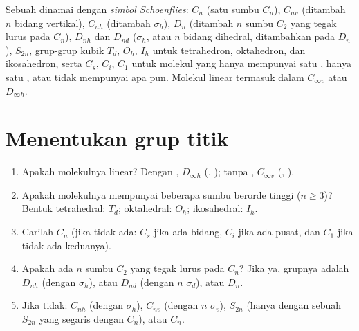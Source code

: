 \begin{definition}\label{def:b3:point-groups:schoenflies}
Sebuah  dinamai dengan \emph{simbol Schoenflies}:
$C_n$ (satu sumbu $C_n$), $C_{nv}$ (ditambah $n$ bidang vertikal), $C_{nh}$
(ditambah $\sigma_h$), $D_n$ (ditambah $n$ sumbu $C_2$ yang tegak lurus pada
$C_n$), $D_{nh}$ dan $D_{nd}$ ($\sigma_h$, atau $n$ bidang dihedral,
ditambahkan pada $D_n$), $S_{2n}$, grup-grup kubik $T_d$, $O_h$, $I_h$ untuk
tetrahedron, oktahedron, dan ikosahedron, serta $C_s$, $C_i$, $C_1$ untuk
molekul yang hanya mempunyai satu , hanya satu ,
atau tidak mempunyai apa pun. Molekul linear termasuk dalam $C_{\infty v}$
atau $D_{\infty h}$.
\end{definition}

\section{Menentukan grup titik}

\begin{method}\label{met:b3:point-groups:assign}
\begin{enumerate}
  \item Apakah molekulnya linear? Dengan , $D_{\infty h}$
        (, ); tanpa , $C_{\infty v}$ (, ).
  \item Apakah molekulnya mempunyai beberapa sumbu berorde tinggi
        ($n \ge 3$)? Bentuk tetrahedral: $T_d$; oktahedral: $O_h$;
        ikosahedral: $I_h$.
  \item Carilah  $C_n$ (jika tidak ada: $C_s$ jika ada bidang,
        $C_i$ jika ada pusat, dan $C_1$ jika tidak ada keduanya).
  \item Apakah ada $n$ sumbu $C_2$ yang tegak lurus pada $C_n$? Jika ya,
        grupnya adalah $D_{nh}$ (dengan $\sigma_h$), atau $D_{nd}$ (dengan $n$
        $\sigma_d$), atau $D_n$.
  \item Jika tidak: $C_{nh}$ (dengan $\sigma_h$), $C_{nv}$ (dengan $n$
        $\sigma_v$), $S_{2n}$ (hanya dengan sebuah $S_{2n}$ yang segaris
        dengan $C_n$), atau $C_n$.
\end{enumerate}
\end{method}

